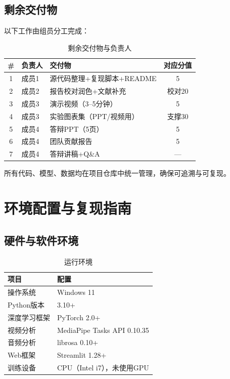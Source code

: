 \section{剩余交付物}

以下工作由组员分工完成：

\begin{table}[H]
    \centering
    \caption{剩余交付物与负责人}
    \label{tab:remaining}
    \begin{tabularx}{\textwidth}{clXc}
        \toprule
        \# & 负责人 & 交付物 & 对应分值 \\
        \midrule
        1 & 成员1 & 源代码整理+复现脚本+README & 5 \\
        2 & 成员2 & 报告校对润色+文献补充 & 校对20 \\
        3 & 成员3 & 演示视频（3--5分钟） & 5 \\
        4 & 成员3 & 实验图表集（PPT/视频用） & 支撑30 \\
        5 & 成员4 & 答辩PPT（5页） & 5 \\
        6 & 成员4 & 团队贡献报告 & 5 \\
        7 & 成员4 & 答辩讲稿+Q\&A & --- \\
        \bottomrule
    \end{tabularx}
\end{table}

所有代码、模型、数据均在项目仓库中统一管理，确保可追溯与可复现。


\chapter{环境配置与复现指南}
\label{ch:reproducibility}

\section{硬件与软件环境}

\begin{table}[H]
    \centering
    \caption{运行环境}
    \label{tab:env}
    \begin{tabular}{ll}
        \toprule
        项目 & 配置 \\
        \midrule
        操作系统 & Windows 11 \\
        Python版本 & 3.10+ \\
        深度学习框架 & PyTorch 2.0+ \\
        视频分析 & MediaPipe Tasks API 0.10.35 \\
        音频分析 & librosa 0.10+ \\
        Web框架 & Streamlit 1.28+ \\
        训练设备 & CPU（Intel i7），未使用GPU \\
        \bottomrule
    \end{tabular}
\end{table}


